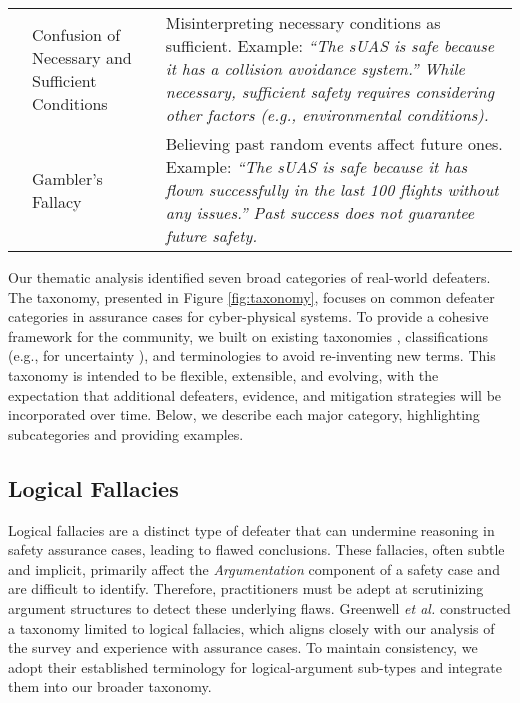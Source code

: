 \begin{table*}[ht]
\begin{tabularx}{\linewidth}{@{}l p{3.7cm} X }
& Confusion of Necessary and Sufficient Conditions & Misinterpreting necessary conditions as sufficient. Example: \textit{``The sUAS is safe because it has a collision avoidance system.'' While necessary, sufficient safety requires considering other factors (e.g., environmental conditions).} \\%
& Gambler's Fallacy & Believing past random events affect future ones. Example: \textit{``The sUAS is safe because it has flown successfully in the last 100 flights without any issues.'' Past success does not guarantee future safety.}\\
\hline

\end{tabularx}
\label{tab:logical_defeater}
\end{table*}

Our thematic analysis identified seven broad categories of real-world defeaters. The taxonomy, presented in Figure \ref{fig:taxonomy}, focuses on common defeater categories in assurance cases for cyber-physical systems. To provide a cohesive framework for the community, we built on existing taxonomies \cite{greenwell2006taxonomy}, classifications (e.g., for uncertainty \cite{ramirez2012taxonomy}), and terminologies to avoid re-inventing new terms. This taxonomy is intended to be flexible, extensible, and evolving, with the expectation that additional defeaters, evidence, and mitigation strategies will be incorporated over time. Below, we describe each major category, highlighting subcategories and providing examples.

\subsection{Logical Fallacies}

Logical fallacies are a distinct type of defeater that can undermine reasoning in safety assurance cases, leading to flawed conclusions. These fallacies, often subtle and implicit, primarily affect the \emph{Argumentation} component of a safety case and are difficult to identify. %
Therefore, practitioners must be adept at scrutinizing argument structures to detect these underlying flaws. Greenwell \MakeLowercase{\textit{et al.}} \cite{greenwell2006taxonomy} constructed a taxonomy limited to logical fallacies, which aligns closely with our analysis of the survey and experience with assurance cases.  
To maintain consistency, we adopt their established terminology for logical-argument sub-types and integrate them into our broader taxonomy.

